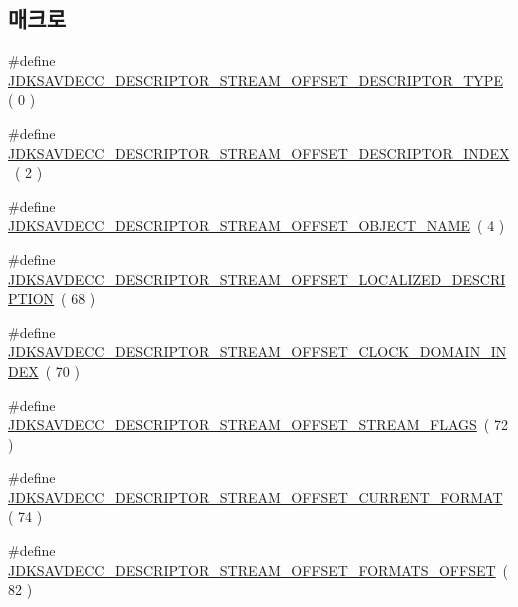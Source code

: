 \subsection*{매크로}
\begin{DoxyCompactItemize}
\item 
\#define \hyperlink{group__descriptor__stream_ga8a333eebac61f1167d9a750dc897b5d8}{J\+D\+K\+S\+A\+V\+D\+E\+C\+C\+\_\+\+D\+E\+S\+C\+R\+I\+P\+T\+O\+R\+\_\+\+S\+T\+R\+E\+A\+M\+\_\+\+O\+F\+F\+S\+E\+T\+\_\+\+D\+E\+S\+C\+R\+I\+P\+T\+O\+R\+\_\+\+T\+Y\+PE}~( 0 )
\item 
\#define \hyperlink{group__descriptor__stream_ga1821578142e5037812545ea4a2651091}{J\+D\+K\+S\+A\+V\+D\+E\+C\+C\+\_\+\+D\+E\+S\+C\+R\+I\+P\+T\+O\+R\+\_\+\+S\+T\+R\+E\+A\+M\+\_\+\+O\+F\+F\+S\+E\+T\+\_\+\+D\+E\+S\+C\+R\+I\+P\+T\+O\+R\+\_\+\+I\+N\+D\+EX}~( 2 )
\item 
\#define \hyperlink{group__descriptor__stream_ga7ea668d8c087e6b1be1b484f58602d62}{J\+D\+K\+S\+A\+V\+D\+E\+C\+C\+\_\+\+D\+E\+S\+C\+R\+I\+P\+T\+O\+R\+\_\+\+S\+T\+R\+E\+A\+M\+\_\+\+O\+F\+F\+S\+E\+T\+\_\+\+O\+B\+J\+E\+C\+T\+\_\+\+N\+A\+ME}~( 4 )
\item 
\#define \hyperlink{group__descriptor__stream_ga2657a8ac3f36d017002e5fe3073942ab}{J\+D\+K\+S\+A\+V\+D\+E\+C\+C\+\_\+\+D\+E\+S\+C\+R\+I\+P\+T\+O\+R\+\_\+\+S\+T\+R\+E\+A\+M\+\_\+\+O\+F\+F\+S\+E\+T\+\_\+\+L\+O\+C\+A\+L\+I\+Z\+E\+D\+\_\+\+D\+E\+S\+C\+R\+I\+P\+T\+I\+ON}~( 68 )
\item 
\#define \hyperlink{group__descriptor__stream_gaa19541e5170b4dddb15bd51b9dec5d26}{J\+D\+K\+S\+A\+V\+D\+E\+C\+C\+\_\+\+D\+E\+S\+C\+R\+I\+P\+T\+O\+R\+\_\+\+S\+T\+R\+E\+A\+M\+\_\+\+O\+F\+F\+S\+E\+T\+\_\+\+C\+L\+O\+C\+K\+\_\+\+D\+O\+M\+A\+I\+N\+\_\+\+I\+N\+D\+EX}~( 70 )
\item 
\#define \hyperlink{group__descriptor__stream_ga57c32580de841e1f737c503c301edb52}{J\+D\+K\+S\+A\+V\+D\+E\+C\+C\+\_\+\+D\+E\+S\+C\+R\+I\+P\+T\+O\+R\+\_\+\+S\+T\+R\+E\+A\+M\+\_\+\+O\+F\+F\+S\+E\+T\+\_\+\+S\+T\+R\+E\+A\+M\+\_\+\+F\+L\+A\+GS}~( 72 )
\item 
\#define \hyperlink{group__descriptor__stream_ga7a5a95301a026cee8fb77bf0f575e93f}{J\+D\+K\+S\+A\+V\+D\+E\+C\+C\+\_\+\+D\+E\+S\+C\+R\+I\+P\+T\+O\+R\+\_\+\+S\+T\+R\+E\+A\+M\+\_\+\+O\+F\+F\+S\+E\+T\+\_\+\+C\+U\+R\+R\+E\+N\+T\+\_\+\+F\+O\+R\+M\+AT}~( 74 )
\item 
\#define \hyperlink{group__descriptor__stream_gaa903203acf8683af611fdff61a45d61d}{J\+D\+K\+S\+A\+V\+D\+E\+C\+C\+\_\+\+D\+E\+S\+C\+R\+I\+P\+T\+O\+R\+\_\+\+S\+T\+R\+E\+A\+M\+\_\+\+O\+F\+F\+S\+E\+T\+\_\+\+F\+O\+R\+M\+A\+T\+S\+\_\+\+O\+F\+F\+S\+ET}~( 82 )

\end{DoxyCompactItemize}
